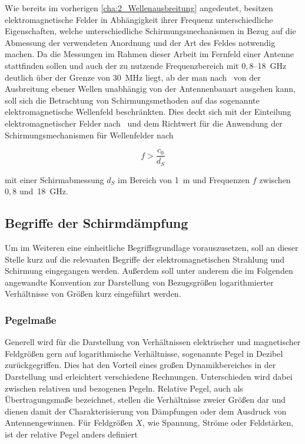 

Wie bereits im vorherigen \Abschnitt \ref{cha:2_Wellenausbreitung} angedeutet, besitzen elektromagnetische Felder in Abhängigkeit ihrer Frequenz unterschiedliche Eigenschaften, welche unterschiedliche Schirmungsmechanismen in Bezug auf die Abmessung der verwendeten Anordnung und der Art des Feldes notwendig machen. Da die Messungen im Rahmen dieser Arbeit im Fernfeld einer Antenne stattfinden sollen und auch der zu nutzende Frequenzbereich mit $0,8$--\SI{18}{\giga\hertz} deutlich über der Grenze von \SI{30}{\mega\hertz} liegt, ab der man nach~\cite{Design_of_shielded_enclosures} von der Ausbreitung ebener Wellen unabhängig von der Antennenbauart ausgehen kann, soll sich die Betrachtung von Schirmungsmethoden auf das sogenannte elektromagnetische Wellenfeld beschränkten. Dies deckt sich mit der Einteilung elektromagnetischer Felder nach~\cite{Feldtheorie_Begriffe} und dem Richtwert für die Anwendung der Schirmungsmechanismen für Wellenfelder nach~\cite{EM_Schirmung}

\begin{equation}
    f > \frac{c_0}{d_S}
\end{equation}

mit einer Schirmabmessung $d_S$ im Bereich von \SI{1}{\meter} und Frequenzen $f$ zwischen $0,8$ und~\SI{18}{\giga\hertz}.




\subsection{Begriffe der Schirmdämpfung}\label{cha:2_sub_Begriff_der_Schirmdaempfung}

Um im Weiteren eine einheitliche Begriffsgrundlage vorauszusetzen, soll an dieser Stelle kurz auf die relevanten Begriffe der elektromagnetischen Strahlung und Schirmung eingegangen werden. Außerdem soll unter anderem die im Folgenden angewandte Konvention zur Darstellung von Bezugsgrößen \mbox{logarithmierter} Verhältnisse von Größen kurz eingeführt werden. 

\subsubsection{Pegelmaße}

Generell wird für die Darstellung von Verhältnissen elektrischer und magnetischer Feldgrößen gern auf logarithmische Verhältnisse, sogenannte Pegel in Dezibel zurückgegriffen. Dies hat den Vorteil eines großen Dynamikbereiches in der Darstellung und erleichtert verschiedene Rechnungen. Unterschieden wird dabei zwischen relativen und bezogenen Pegeln. Relative Pegel, auch als Übertragungsmaße bezeichnet, stellen die Verhältnisse zweier Größen dar und dienen damit der Charakterisierung von Dämpfungen oder dem Ausdruck von Antennengewinnen. Für Feldgrößen $X$, wie Spannung, Ströme oder Feldstärken, ist der relative Pegel anders definiert~\cite{EM_Schirmung}

